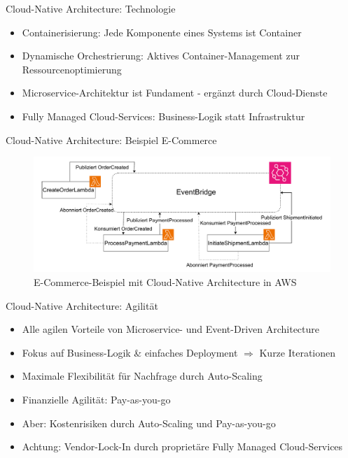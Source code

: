 \begin{frame}{Cloud-Native Architecture: Technologie}
    \begin{itemize}
        \item Containerisierung: Jede Komponente eines Systems ist Container
        \item Dynamische Orchestrierung: Aktives Container-Management zur Ressourcenoptimierung
        \item Microservice-Architektur ist Fundament - ergänzt durch Cloud-Dienste
        \item Fully Managed Cloud-Services: Business-Logik statt Infrastruktur
    \end{itemize}
\end{frame}

\begin{frame}{Cloud-Native Architecture: Beispiel E-Commerce}
    \begin{figure}[!h]
        \centering
        \includegraphics[scale=0.5]{imglib/cloud-native/cloud-native-ecommerce.drawio}
        \caption{E-Commerce-Beispiel mit Cloud-Native Architecture in AWS}
        \label{fig:cloudnativeecommerce}
    \end{figure}
\end{frame}

\begin{frame}{Cloud-Native Architecture: Agilität}
    \begin{itemize}
        \item Alle agilen Vorteile von Microservice- und Event-Driven Architecture
        \item Fokus auf Business-Logik \& einfaches Deployment $\Rightarrow$ Kurze Iterationen
        \item Maximale Flexibilität für Nachfrage durch Auto-Scaling
        \item Finanzielle Agilität: Pay-as-you-go
        \item Aber: Kostenrisiken durch Auto-Scaling und Pay-as-you-go
        \item Achtung: Vendor-Lock-In durch proprietäre Fully Managed Cloud-Services
    \end{itemize}
\end{frame}

